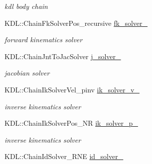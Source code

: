 \begin{DoxyCompactItemize}
\begin{DoxyCompactList}\small\item\em kdl body chain \end{DoxyCompactList}\item 
K\+D\+L\+::\+Chain\+Fk\+Solver\+Pos\+\_\+recursive \hyperlink{classow__ik_1_1RobotLimb_a5fe80f8e2684b166d2abb6191dc1dad8}{fk\+\_\+solver\+\_\+}\hypertarget{classow__ik_1_1RobotLimb_a5fe80f8e2684b166d2abb6191dc1dad8}{}\label{classow__ik_1_1RobotLimb_a5fe80f8e2684b166d2abb6191dc1dad8}

\begin{DoxyCompactList}\small\item\em forward kinematics solver \end{DoxyCompactList}\item 
K\+D\+L\+::\+Chain\+Jnt\+To\+Jac\+Solver \hyperlink{classow__ik_1_1RobotLimb_a854a39e0825de0f81d745d3b57947c95}{j\+\_\+solver\+\_\+}\hypertarget{classow__ik_1_1RobotLimb_a854a39e0825de0f81d745d3b57947c95}{}\label{classow__ik_1_1RobotLimb_a854a39e0825de0f81d745d3b57947c95}

\begin{DoxyCompactList}\small\item\em jacobian solver \end{DoxyCompactList}\item 
K\+D\+L\+::\+Chain\+Ik\+Solver\+Vel\+\_\+pinv \hyperlink{classow__ik_1_1RobotLimb_a3a66c477a006dbaf29ef4e174e0b5054}{ik\+\_\+solver\+\_\+v\+\_\+}\hypertarget{classow__ik_1_1RobotLimb_a3a66c477a006dbaf29ef4e174e0b5054}{}\label{classow__ik_1_1RobotLimb_a3a66c477a006dbaf29ef4e174e0b5054}

\begin{DoxyCompactList}\small\item\em inverse kinematics solver \end{DoxyCompactList}\item 
K\+D\+L\+::\+Chain\+Ik\+Solver\+Pos\+\_\+\+NR \hyperlink{classow__ik_1_1RobotLimb_a53a00659f9333846362dd34dac1d5636}{ik\+\_\+solver\+\_\+p\+\_\+}\hypertarget{classow__ik_1_1RobotLimb_a53a00659f9333846362dd34dac1d5636}{}\label{classow__ik_1_1RobotLimb_a53a00659f9333846362dd34dac1d5636}

\begin{DoxyCompactList}\small\item\em inverse kinematics solver \end{DoxyCompactList}\item 
K\+D\+L\+::\+Chain\+Id\+Solver\+\_\+\+R\+NE \hyperlink{classow__ik_1_1RobotLimb_a9de9df1fe45957d766e1178ca8eaaede}{id\+\_\+solver\+\_\+}\hypertarget{classow__ik_1_1RobotLimb_a9de9df1fe45957d766e1178ca8eaaede}{}\label{classow__ik_1_1RobotLimb_a9de9df1fe45957d766e1178ca8eaaede}


\end{DoxyCompactItemize}
